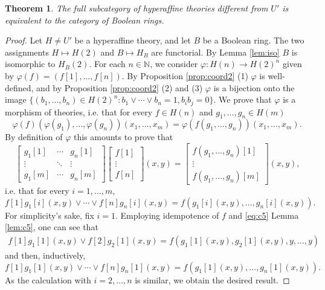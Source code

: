 \documentclass{amsart}
\numberwithin{equation}{section}
\theoremstyle{plain}
\newtheorem{theorem}{Theorem}[section]
\theoremstyle{definition}
\begin{document}
\begin{theorem}
  \label{thm:equibool}
  The full subcategory of hyperaffine theories different from $U'$ is equivalent to the category of Boolean rings. 
\end{theorem}
\begin{proof}
    Let $H \neq U'$ be a hyperaffine theory, and let $B$ be a Boolean ring. 
    The two assignments $H \mapsto H(2)$ and $B \mapsto H_B$ are functorial. 
    By Lemma \ref{lem:iso} $B$ is isomorphic to $H_B(2)$. 
    For each $n \in \mathbb{N}$, we consider $\varphi: H(n) \to H(2)^n$ given by $\varphi(f) = (f[1], \ldots, f[n])$. 
    By Proposition \ref{prop:coord2} (1) $\varphi$ is well-defined, and by Proposition \ref{prop:coord2} (2) and (3) $\varphi$ is a bijection onto the image $\{(b_1, \ldots, b_n) \in H(2)^n : b_1 \lor \cdots \lor b_n =1, b_i b_j =0 \}$. 
    We prove that $\varphi$ is a morphism of theories, i.e. that for every $f \in H(n)$ and $g_1, \ldots, g_n \in H(m)$
  \begin{equation*}
    \varphi(f)(\varphi(g_1), \ldots, \varphi(g_n))(x_1, \ldots, x_m) = \varphi(f(g_1, \ldots,g_n))(x_1, \ldots, x_m) \text{.} 
  \end{equation*}
  By definition of $\varphi$ this amounts to prove that 
  \begin{equation*}
    \begin{bmatrix}
      g_1[1] & \cdots & g_n[1] \\
      \vdots & \ddots & \vdots \\
      g_1[m] & \cdots & g_n[m] 
    \end{bmatrix}
    \begin{bmatrix}
      f[1] \\
      \vdots \\
      f[n]
    \end{bmatrix}
    (x,y) = 
    \begin{bmatrix}
    f(g_1, \ldots, g_n)[1] \\
    \vdots \\
    f(g_1, \ldots, g_n)[m]
    \end{bmatrix}
    (x,y) \text{,}
  \end{equation*}
  i.e. that for every $i=1, \ldots, m$, 
  \begin{equation*}
    f[1]g_1[i] (x,y) \lor \cdots  \lor f[n]g_n[i](x,y)  = f(g_1[i](x,y), \ldots, g_n[i](x,y)) \text{.}
  \end{equation*} 
  For simplicity's sake, fix $i=1$. 
  Employing idempotence of $f$ and \eqref{eq:c5} Lemma \ref{lem:c5}, one can see that 
  \begin{align*}
    f[1]g_1[1] (x,y) \lor f[2]g_2[1](x,y) = f(g_1[1](x,y), g_2[1](x,y), y, \ldots, y)
  \end{align*}
  and then, inductively, 
  $$f[1]g_1[1] (x,y) \lor \cdots \lor f[n]g_n[1](x,y)=f(g_1[1](x,y), \ldots, g_n[1](x,y))\text{.}$$ 
  As the calculation with $i=2, \ldots, n$ is similar, we obtain the desired result. 
\end{proof}
\end{document}

